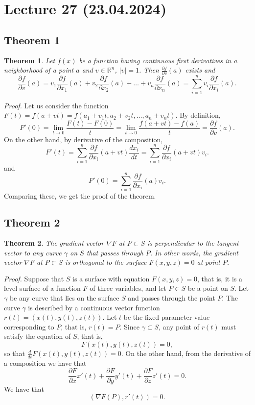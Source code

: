 \documentclass{article}
\newtheorem{theorem}{Theorem}
\begin{document}
\section*{Lecture 27 (23.04.2024)}

\subsection*{Theorem 1}

\begin{theorem}
Let $f(x)$ be a function having continuous first derivatives in a neighborhood of a point $a$ and $v \in \mathbb{R}^n$, $|v| = 1$. Then $\frac{\partial f}{\partial v}(a)$ exists and
\[
\frac{\partial f}{\partial v}(a) = v_1 \frac{\partial f}{\partial x_1}(a) + v_2 \frac{\partial f}{\partial x_2}(a) + \dots + v_n \frac{\partial f}{\partial x_n}(a) = \sum_{i=1}^{n} v_i \frac{\partial f}{\partial x_i}(a).
\]
\end{theorem}

\vspace{1em}

\textit{Proof.} Let us consider the function $F(t) = f(a + vt) = f(a_1 + v_1 t, a_2 + v_2 t, \dots, a_n + v_n t)$. By definition,
\[
F'(0) = \lim_{t \to 0} \frac{F(t) - F(0)}{t} = \lim_{t \to 0} \frac{f(a + vt) - f(a)}{t} = \frac{\partial f}{\partial v}(a).
\]
On the other hand, by derivative of the composition,
\[
F'(t) = \sum_{i=1}^{n} \frac{\partial f}{\partial x_i}(a + vt) \frac{dx_i}{dt} = \sum_{i=1}^{n} \frac{\partial f}{\partial x_i}(a + vt) v_i.
\]
and
\[
F'(0) = \sum_{i=1}^{n} \frac{\partial f}{\partial x_i}(a) v_i.
\]
Comparing these, we get the proof of the theorem.

\subsection*{Theorem 2}

\begin{theorem}
The gradient vector $\nabla F$ at $P \subset S$ is perpendicular to the tangent vector to any curve $\gamma$ on $S$ that passes through $P$. In other words, the gradient vector $\nabla F$ at $P \subset S$ is orthogonal to the surface $F(x, y, z) = 0$ at point $P$.
\end{theorem}

\vspace{1em}

\textit{Proof.} Suppose that $S$ is a surface with equation $F(x, y, z) = 0$, that is, it is a level surface of a function $F$ of three variables, and let $P \in S$ be a point on $S$. Let $\gamma$ be any curve that lies on the surface $S$ and passes through the point $P$. The curve $\gamma$ is described by a continuous vector function $r(t) = (x(t), y(t), z(t))$. Let $t$ be the fixed parameter value corresponding to $P$, that is, $r(t) = P$. Since $\gamma \subset S$, any point of $r(t)$ must satisfy the equation of $S$, that is,
\[
F(x(t), y(t), z(t)) = 0,
\]
so that $\frac{d}{dt}F(x(t), y(t), z(t)) = 0$. On the other hand, from the derivative of a composition we have that
\[
\frac{\partial F}{\partial x} x'(t) + \frac{\partial F}{\partial y} y'(t) + \frac{\partial F}{\partial z} z'(t) = 0.
\]
We have that
\[
(\nabla F(P), r'(t)) = 0.
\]
\end{document}
